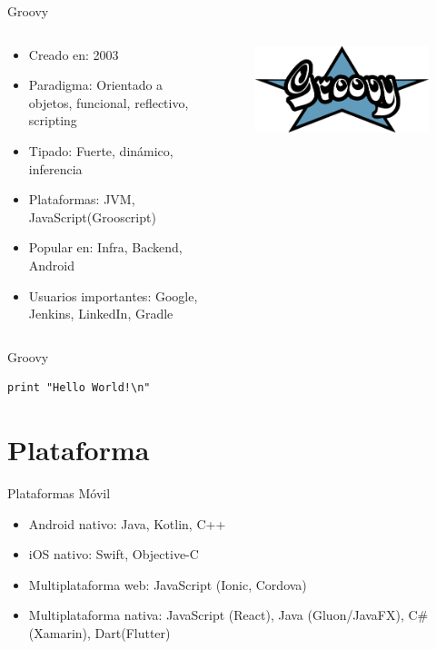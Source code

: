 \documentclass[aspectratio=169]{beamer}
\begin{document}
\begin{frame}{Groovy}
	\begin{columns}[T] %
		\begin{column}[T]{0.5\textwidth} %
			\begin{itemize}
				\item Creado en: 2003
				\item Paradigma: Orientado a objetos, funcional, reflectivo, scripting
				\item Tipado: Fuerte, dinámico, inferencia
				\item Plataformas: JVM, JavaScript(Grooscript)
				\item Popular en: Infra, Backend, Android
				\item Usuarios importantes: Google, Jenkins, LinkedIn, Gradle
			\end{itemize}
		\end{column}
		\begin{column}[T]{7cm} %
			\begin{figure}
				\centering
				\includegraphics[width=0.5\linewidth]{Images/groovy}
			\end{figure}

		\end{column}
	\end{columns}
\end{frame}

\begin{frame}[fragile]{Groovy}
\begin{lstlisting}
print "Hello World!\n"
\end{lstlisting}
\end{frame}



\section{Plataforma}

\begin{frame}{Plataformas}
    Móvil
	\begin{itemize}
	\item Android nativo: Java, Kotlin, C++
    \item iOS nativo: Swift, Objective-C
    \item Multiplataforma web: JavaScript (Ionic, Cordova)
    \item Multiplataforma nativa: JavaScript (React), Java (Gluon/JavaFX), C\# (Xamarin), Dart(Flutter)
	\end{itemize}
\end{frame}
\end{document}
